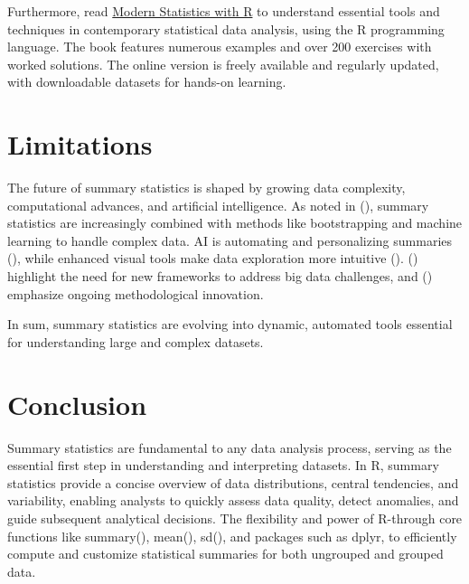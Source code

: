 \documentclass[
  man,
  floatsintext,
  longtable,
  nolmodern,
  notxfonts,
  notimes,
  colorlinks=true,linkcolor=blue,citecolor=blue,urlcolor=blue]{apa7}
\begin{document}
Furthermore, read
\href{https://modernstatisticswithr.com/index.html}{Modern Statistics
with R} to understand essential tools and techniques in contemporary
statistical data analysis, using the R programming language. The book
features numerous examples and over 200 exercises with worked solutions.
The online version is freely available and regularly updated, with
downloadable datasets for hands-on learning.

\vspace{1cm}

\section{Limitations}\label{limitations}

The future of summary statistics is shaped by growing data complexity,
computational advances, and artificial intelligence. As noted in
(), summary
statistics are increasingly combined with methods like bootstrapping and
machine learning to handle complex data. AI is automating and
personalizing summaries (), while enhanced visual tools make data exploration more intuitive
().
() highlight the need
for new frameworks to address big data challenges, and
() emphasize
ongoing methodological innovation.

In sum, summary statistics are evolving into dynamic, automated tools
essential for understanding large and complex datasets.

\newpage

\section{Conclusion}\label{conclusion}

Summary statistics are fundamental to any data analysis process, serving
as the essential first step in understanding and interpreting datasets.
In R, summary statistics provide a concise overview of data
distributions, central tendencies, and variability, enabling analysts to
quickly assess data quality, detect anomalies, and guide subsequent
analytical decisions. The flexibility and power of R-through core
functions like summary(), mean(), sd(), and packages such as dplyr, to
efficiently compute and customize statistical summaries for both
ungrouped and grouped data.
\end{document}

